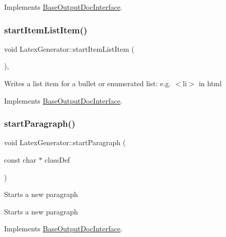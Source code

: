 Implements \mbox{\hyperlink{class_base_output_doc_interface_a54b169393594b6cf113977ccccaeb9ee}{Base\+Output\+Doc\+Interface}}.

\mbox{\label{class_latex_generator_ae7a65542a815c62b5a55283fcc68d774}} 
\subsubsection{\texorpdfstring{startItemListItem()}{startItemListItem()}}
{\footnotesize\ttfamily void Latex\+Generator\+::start\+Item\+List\+Item (\begin{DoxyParamCaption}{ }\end{DoxyParamCaption})\hspace{0.3cm}{\ttfamily [inline]}, {\ttfamily [virtual]}}

Writes a list item for a bullet or enumerated list\+: e.\+g. {\ttfamily $<$li$>$} in html 

Implements \mbox{\hyperlink{class_base_output_doc_interface_aa1cbcadfedf8e6d52029d17526b5fa3f}{Base\+Output\+Doc\+Interface}}.

\mbox{\label{class_latex_generator_a467ae3fdba818b4efaefb168455c4796}} 
\subsubsection{\texorpdfstring{startParagraph()}{startParagraph()}}
{\footnotesize\ttfamily void Latex\+Generator\+::start\+Paragraph (\begin{DoxyParamCaption}\item[{const char $\ast$}]{class\+Def }\end{DoxyParamCaption})\hspace{0.3cm}{\ttfamily [virtual]}}

Starts a new paragraph

Starts a new paragraph 

Implements \mbox{\hyperlink{class_base_output_doc_interface_a9f711f4ef8f48b9c7b1cae625578e7ff}{Base\+Output\+Doc\+Interface}}.

\mbox{\label{class_latex_generator_a72fe56f1f20836344b8fdf003c1a442e}} 
